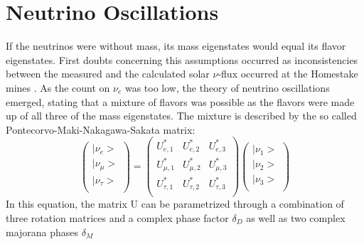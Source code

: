     
    \section{Neutrino Oscillations}
    \label{ch:Introduction:sec:neutrino Oscillations}
      If the neutrinos were without mass, its mass eigenstates would equal its flavor eigenstates.
    First doubts concerning this assumptions occurred as inconsistencies between the measured and the calculated solar $\nu$-flux occurred at the Homestake mines \cite{homestake}. As the count on $\nu_e$ was too low, the theory of neutrino oscillations emerged, stating that a mixture of flavors was possible as the flavors were made up of all three of the mass eigenstates. The mixture is described by the so called Pontecorvo-Maki-Nakagawa-Sakata matrix:
        \begin{equation}
        \left(
        \begin{array}{c}
	  |\nu_e>\\
	  |\nu_\mu>\\
	  |\nu_\tau>\\
        \end{array}
        \right)
	 = \left(
	\begin{array}{ccc}
      	U^*_{e,1} & U^*_{e,2} & U^*_{e,3}\\
      	U^*_{\mu,1} & U^*_{\mu,2} & U^*_{\mu,3}\\
      	U^*_{\tau,1} & U^*_{\tau,2} & U^*_{\tau,3}\\
      	\end{array}
	\right)
	\left(
	\begin{array}{c}
      	|\nu_1>\\
      	|\nu_2>\\
      	|\nu_3>\\
    	 \end{array}
    	 \right)
    \end{equation}
    In this equation, the matrix U can be parametrized through a combination of three rotation matrices and a complex phase factor $\delta_D$ as well as two complex majorana phases $\delta_M$
    
